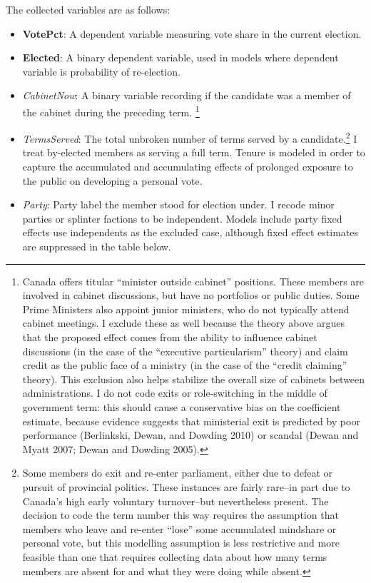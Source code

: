 \documentclass[letter,12pt]{article}
\begin{document}
\noindent The collected variables are as follows:
\begin{itemize}
\item \textbf{VotePct}: A dependent variable measuring vote share in the current election. 
\item \textbf{Elected}: A binary dependent variable, used in models where dependent variable is probability of re-election.
\item \textit{CabinetNow}: A binary variable recording if the candidate was a member of the cabinet during the preceding term. \footnote{Canada offers titular ``minister outside cabinet'' positions. These members are involved in cabinet discussions, but have no portfolios or public duties. Some Prime Ministers also appoint junior ministers, who do not typically attend cabinet meetings. I exclude these as well because the theory above argues that the proposed effect comes from the ability to influence cabinet discussions (in the case of the ``executive particularism'' theory) and claim credit as the public face of a ministry (in the case of the ``credit claiming'' theory). This exclusion also helps stabilize the overall size of cabinets between administrations. I do not code exits or role-switching in the middle of government term: this should cause a conservative bias on the coefficient estimate, because evidence suggests that ministerial exit is predicted by poor performance (Berlinkski, Dewan, and Dowding 2010) or scandal (Dewan and Myatt 2007; Dewan and Dowding 2005).}
\item \textit{TermsServed}: The total unbroken number of terms served by a candidate.\footnote{Some members do exit and re-enter parliament, either due to defeat or pursuit of provincial politics. These instances are fairly rare--in part due to Canada's high early voluntary turnover--but nevertheless present. The decision to code the term number this way requires the assumption that members who leave and re-enter ``lose'' some accumulated mindshare or personal vote, but this modelling assumption is less restrictive and more feasible than one that requires collecting data about how many terms members are absent for and what they were doing while absent.} I treat by-elected members as serving a full term. Tenure is modeled in order to capture the accumulated and accumulating effects of prolonged exposure to the public on developing a personal vote.
\item \textit{Party}: Party label the member stood for election under. I recode minor parties or splinter factions to be independent. Models include party fixed effects use independents as the excluded case, although fixed effect estimates are suppressed in the table below.

\end{itemize}
\end{document}
